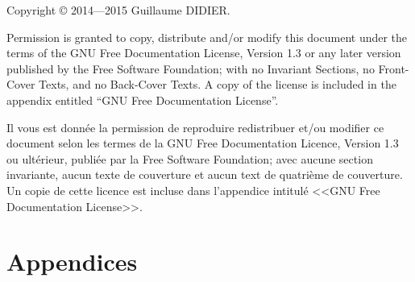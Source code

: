 
\title{\TSwiftTitle}

\newcommand{\TSwiftRoot}[0]{.} %


\frontmatter
\maketitle
\begin{otherlanguage}{english}
Copyright \copyright{}  2014---2015 Guillaume DIDIER.

Permission is granted to copy, distribute and/or modify this document
under the terms of the GNU Free Documentation License, Version 1.3
or any later version published by the Free Software Foundation;
with no Invariant Sections, no Front-Cover Texts, and no Back-Cover Texts.
A copy of the license is included in the appendix entitled ``GNU
Free Documentation License''.
\end{otherlanguage}

Il vous est donnée la permission de reproduire redistribuer et/ou modifier ce document selon les termes de la GNU Free Documentation Licence, Version 1.3 ou ultérieur, publiée par la Free Software Foundation; avec aucune section invariante, aucun texte de couverture et aucun text de quatrième de couverture.
Un copie de cette licence est incluse dans l'appendice intitulé <<GNU Free Documentation License>>.
\tableofcontents


\mainmatter


\appendix
\part*{Appendices}


\backmatter



